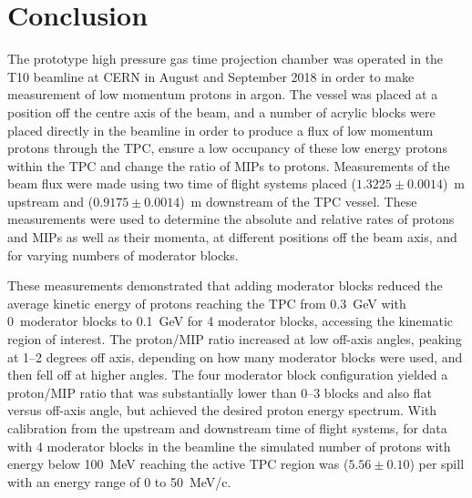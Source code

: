 \section{Conclusion}
\label{hptpcPaper:sec:Conclusion}

The prototype high pressure gas time projection chamber was operated in the T10 beamline at CERN in August and September 2018 in order to make measurement of low momentum protons in argon.
The vessel was placed at a position off the centre axis of the beam, and a number of acrylic blocks were placed directly in the beamline in order to produce a flux of low momentum protons through the TPC, ensure a low occupancy of these low energy protons within the TPC and change the ratio of MIPs to protons.
Measurements of the beam flux were made using two time of flight systems placed ($1.3225 \pm 0.0014$)~m upstream and ($0.9175 \pm 0.0014$)~m downstream of the TPC vessel.
These measurements were used to determine the absolute and relative rates of protons and MIPs as well as their momenta, at different positions off the beam axis, and for varying numbers of moderator blocks.

These measurements demonstrated that adding moderator blocks reduced the average kinetic energy of protons reaching the TPC from 0.3~GeV with 0~moderator blocks to 0.1~GeV for 4 moderator blocks, accessing the kinematic region of interest.
The proton/MIP ratio increased at low off-axis angles, peaking at 1–2 degrees off axis, depending on how many moderator blocks were used, and then fell off at higher angles.
The four moderator block configuration yielded a proton/MIP ratio that was  substantially lower than 0–3 blocks and also flat versus off-axis angle, but achieved the desired proton energy spectrum.
With calibration from the upstream and downstream time of flight systems, for data with 4 moderator blocks in the beamline the simulated number of protons with energy below 100~MeV reaching the active TPC region was ($5.56 \pm  0.10$) per spill with an energy range of 0 to 50~MeV/c.


